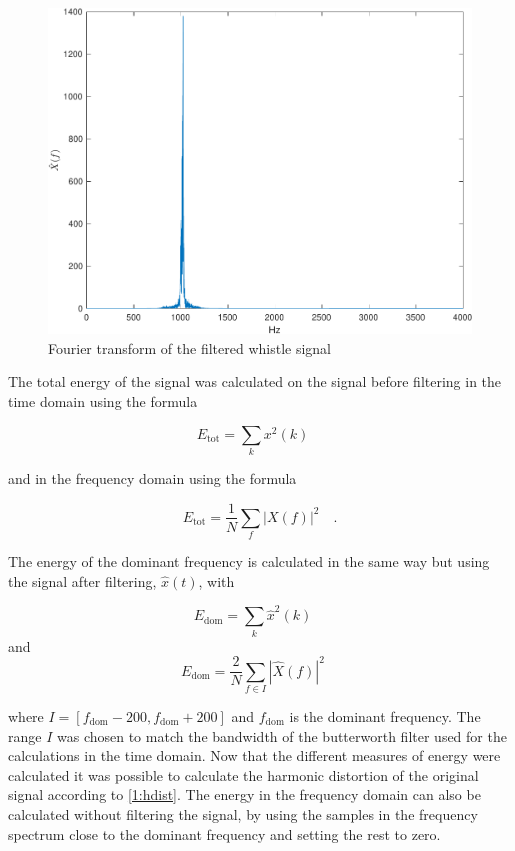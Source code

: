 \documentclass{IEEEtran}
\begin{document}
\begin{figure}[h]
  \centering
  \captionsetup{justification=centering}

  \includegraphics[width=0.8\columnwidth]{pictures/whistle_clean.pdf}
  \caption{Fourier transform of the filtered whistle signal}
  \label{1:whistle_clean}

\end{figure}

The total energy of the signal was calculated on the signal before filtering
in the time domain using the formula

\begin{equation*}
    E_{\text{tot}} = \sum_k{x^2(k)} \quad
\end{equation*}

and in the frequency domain using the formula

\begin{equation*}
    E_{\text{tot}} = \frac{1}{N}\sum_f{|X(f)|^2} \quad .
\end{equation*}

The energy of the dominant frequency is calculated in the same way but
using the signal after filtering, $\hat{x}(t)$, with

\begin{equation*}
    E_{\text{dom}} = \sum_k{\hat{x}^2(k)} \quad
\end{equation*}
and
\begin{equation*}
    E_{\text{dom}} = \frac{2}{N}\sum_{f \in I}{|\hat{X}(f)|^2} \quad
\end{equation*}

where $I = [f_{\text{dom}} - 200, f_{\text{dom}} + 200]$ and $f_{\text{dom}}$
is the dominant
frequency. The range $I$ was chosen to match the bandwidth of the butterworth
filter used for the calculations in the time domain.
Now that the different measures of energy were calculated it was possible to
calculate the harmonic distortion of the original signal according to
\eqref{1:hdist}. The energy in the frequency domain can also be calculated
without filtering the signal, by using the samples in the frequency spectrum
close to the dominant frequency and setting the rest to zero.
\end{document}

